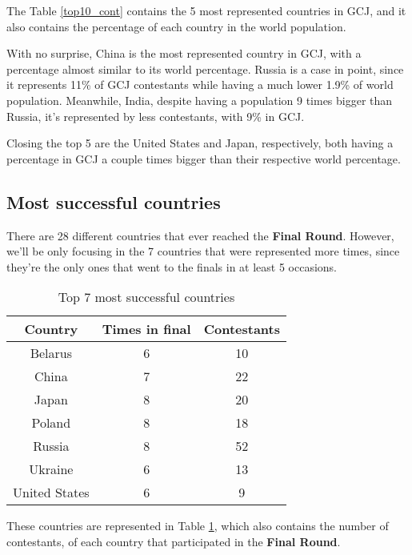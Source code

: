 \documentclass{article}
\begin{document}
\begin{multicols*}{2}
The Table \ref{top10_cont} contains the 5 most represented countries in GCJ, and it also contains the percentage of each country in the world population\cite{world_perc}.

With no surprise, China is the most represented country in GCJ, with a percentage almost similar to its world percentage.
Russia is a case in point, since it represents 11\% of GCJ contestants while having a much lower 1.9\% of world population. Meanwhile, India, despite having a population 9 times bigger than Russia, it's represented by less contestants, with 9\% in GCJ.

Closing the top 5 are the United States and Japan, respectively, both having a percentage in GCJ a couple times bigger than their respective world percentage.


\subsection{Most successful countries}

There are 28 different countries that ever reached the \textbf{Final Round}. However, we'll be only focusing in the 7 countries that were represented more times, since they're the only ones that went to the finals in at least 5 occasions.

\begin{table}[H]
\centering
\caption{Top 7 most successful countries}
\label{top7_suc}
\begin{tabular}{c|c|c}
\textbf{Country} & \textbf{Times in final} & \textbf{Contestants} \\ \hline
Belarus          & 6                       & 10                            \\
China            & 7                       & 22                            \\
Japan            & 8                       & 20                            \\
Poland           & 8                       & 18                            \\
Russia           & 8                       & 52                            \\
Ukraine          & 6                       & 13                            \\
United States    & 6                       & 9
\end{tabular}
\end{table}

These countries are represented in Table \ref{top7_suc}, which also contains the number of contestants, of each country that participated in the \textbf{Final Round}.


\end{multicols*}
\end{document}
